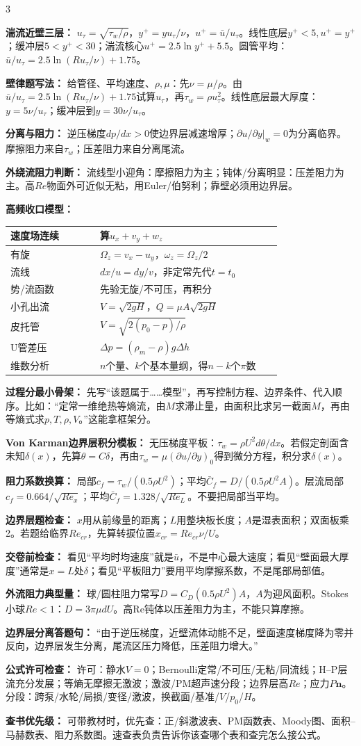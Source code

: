 \documentclass[a4paper]{article}
\newcommand{\sect}[1]{\par{\bfseries\color{Q}#1：}}
\begin{document}
\begin{multicols}{3}
{\sect{湍流近壁三层}
$u_\tau=\sqrt{\tau_w/\rho}$，$y^+=yu_\tau/\nu$，$u^+=\bar u/u_\tau$。线性底层$y^+<5,u^+=y^+$；缓冲层$5<y^+<30$；湍流核心$u^+=2.5\ln y^+ +5.5$。圆管平均：$\bar u/u_\tau=2.5\ln(Ru_\tau/\nu)+1.75$。
\sect{壁律题写法}
给管径、平均速度、$\rho,\mu$：先$\nu=\mu/\rho$。由$\bar u/u_\tau=2.5\ln(Ru_\tau/\nu)+1.75$试算$u_\tau$，再$\tau_w=\rho u_\tau^2$。线性底层最大厚度：$y=5\nu/u_\tau$；缓冲层到$y=30\nu/u_\tau$。

\sect{分离与阻力}
逆压梯度$dp/dx>0$使边界层减速增厚；$\partial u/\partial y|_w=0$为分离临界。摩擦阻力来自$\tau_w$；压差阻力来自分离尾流。
\sect{外绕流阻力判断}
流线型小迎角：摩擦阻力为主；钝体/分离明显：压差阻力为主。高$Re$物面外可近似无粘，用Euler/伯努利；靠壁必须用边界层。

\sect{高频收口模型}
\renewcommand{\arraystretch}{0.76}\begin{tabular}{|p{0.30\linewidth}|p{0.61\linewidth}|}
\hline 速度场连续 & 算$u_x+v_y+w_z$\\ \hline
有旋 & $\Omega_z=v_x-u_y$，$\omega_z=\Omega_z/2$\\ \hline
流线 & $dx/u=dy/v$，非定常先代$t=t_0$\\ \hline
势/流函数 & 先验无旋/不可压，再积分\\ \hline
小孔出流 & $V=\sqrt{2gH}$，$Q=\mu A\sqrt{2gH}$\\ \hline
皮托管 & $V=\sqrt{2(p_0-p)/\rho}$\\ \hline
U管差压 & $\Delta p=(\rho_m-\rho)g\Delta h$\\ \hline
维数分析 & $n$个量、$k$个基本量纲，得$n-k$个$\pi$数\\ \hline
\end{tabular}\renewcommand{\arraystretch}{1}

\sect{过程分最小骨架}
先写“该题属于……模型”，再写控制方程、边界条件、代入顺序。比如：“定常一维绝热等熵流，由$M$求滞止量，由面积比求另一截面$M$，再由等熵式求$p,T,\rho,V$。”这能拿框架分。
\sect{Von Karman边界层积分模板}
无压梯度平板：$\tau_w=\rho U^2d\theta/dx$。若假定剖面含未知$\delta(x)$，先算$\theta=C\delta$，再由$\tau_w=\mu(\partial u/\partial y)_0$得到微分方程，积分求$\delta(x)$。
\sect{阻力系数换算}
局部$c_f=\tau_w/(0.5\rho U^2)$；平均$\bar C_f=D/(0.5\rho U^2A)$。层流局部$c_f=0.664/\sqrt{Re_x}$；平均$\bar C_f=1.328/\sqrt{Re_L}$。不要把局部当平均。
\sect{边界层题检查}
$x$用从前缘量的距离；$L$用整块板长度；$A$是湿表面积；双面板乘2。若题给临界$Re_{cr}$，先算转捩位置$x_{cr}=Re_{cr}\nu/U$。
\sect{交卷前检查}
看见“平均时均速度”就是$\bar u$，不是中心最大速度；看见“壁面最大厚度”通常是$x=L$处$\delta$；看见“平板阻力”要用平均摩擦系数，不是尾部局部值。
\sect{外流阻力典型量}
球/圆柱阻力常写$D=C_D(0.5\rho U^2)A$，$A$为迎风面积。Stokes小球$Re<1$：$D=3\pi\mu dU$。高Re钝体以压差阻力为主，不能只算摩擦。
\sect{边界层分离答题句}
“由于逆压梯度，近壁流体动能不足，壁面速度梯度降为零并反向，边界层发生分离，尾流区压力降低，压差阻力增大。”
\sect{公式许可检查}
许可：静水$V=0$；Bernoulli定常/不可压/无粘/同流线；H--P层流充分发展；等熵无摩擦无激波；激波/PM超声速分段；边界层高$Re$；应力$P\bm n$。分段：跨泵/水轮/局损/变径/激波，换截面/基准/$V$/$p_0$/$H$。
\sect{查书优先级}
可带教材时，优先查：正/斜激波表、PM函数表、Moody图、面积--马赫数表、阻力系数图。速查表负责告诉你该查哪个表和查完怎么接公式。

}
\end{multicols}
\end{document}
